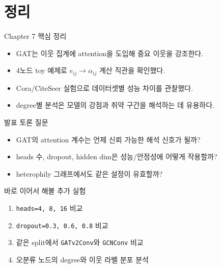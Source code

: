 \section{정리}

\begin{frame}{Chapter 7 핵심 정리}
\begin{itemize}
  \item GAT는 이웃 집계에 attention을 도입해 중요 이웃을 강조한다.
  \item 4노드 toy 예제로 $e_{ij}\rightarrow\alpha_{ij}$ 계산 직관을 확인했다.
  \item Cora/CiteSeer 실험으로 데이터셋별 성능 차이를 관찰했다.
  \item degree별 분석은 모델의 강점과 취약 구간을 해석하는 데 유용하다.
\end{itemize}
\end{frame}

\begin{frame}{발표 토론 질문}
\begin{itemize}
  \item GAT의 attention 계수는 언제 신뢰 가능한 해석 신호가 될까?
  \item heads 수, dropout, hidden dim은 성능/안정성에 어떻게 작용할까?
  \item heterophily 그래프에서도 같은 설정이 유효할까?
\end{itemize}
\end{frame}

\begin{frame}{바로 이어서 해볼 추가 실험}
\begin{enumerate}
  \item \texttt{heads=4, 8, 16} 비교
  \item \texttt{dropout=0.3, 0.6, 0.8} 비교
  \item 같은 split에서 \texttt{GATv2Conv}와 \texttt{GCNConv} 비교
  \item 오분류 노드의 degree와 이웃 라벨 분포 분석
\end{enumerate}
\end{frame}
